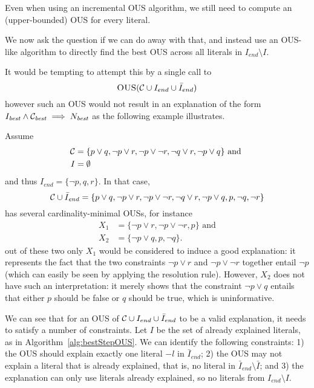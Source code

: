 Even when using an incremental OUS algorithm, we still need to compute an (upper-bounded) OUS for every literal.

We now ask the question if we can do away with that, and instead use an OUS-like algorithm to directly find the best OUS across all literals in $I_{end} \setminus I$.

It would be tempting to attempt this by a single call to 
\[\textsc{OUS}(\mathcal{C}  \cup I_{end} \cup \bar{I}_{end})\]
however such an OUS would not result in an explanation of the form $I_{\mathit{best}} \wedge \mathcal{C} _{\mathit{best}} \implies N_{\mathit{best}}$ as the following example illustrates. 
\begin{example}
Assume \begin{align*}
         \mathcal{C}  &= \{p\lor q, \lnot p \lor r, \lnot p \lor \lnot r, \lnot q\lor r, \lnot p \lor q \}\text{ and }\\
         I &= \emptyset
       \end{align*}
       and thus
$         I_{\mathit{end}} = \{ \lnot p, q, r\}.$
In that case, 
\[\mathcal{C} \cup \bar{I}_{\mathit{end}} = \{p\lor q, \lnot p \lor r, \lnot p \lor \lnot r, \lnot q\lor r, \lnot p \lor q , p,\lnot q,\lnot r \}\]
has several cardinality-minimal OUSs, for instance 
\begin{align*}
X_1 &=    \{\lnot p \lor r, \lnot p \lor \lnot r, p\}\text{ and}\\
X_2 &= \{\lnot p \lor q ,  p, \lnot q\}.
\end{align*}
out of these two only $X_1$ would be considered to induce a good explanation: it represents the fact that the two constraints $\lnot p \lor r$ and $ \lnot p \lor \lnot r$ together entail $\lnot p$ (which can easily be seen by applying the resolution rule). However, $X_2$ does not have such an interpretation: it merely shows that the constraint $\lnot p \lor q$ entails that either $p$ should be false or $q$ should be true, which is uninformative. 
\end{example}

We can see that for an OUS of $\mathcal{C}  \cup I_{end} \cup \bar{I}_{end}$ to be a valid explanation, it needs to satisfy a number of constraints. Let $I$ be the set of already explained literals, as in Algorithm~\ref{alg:bestStepOUS}. We can identify the following constraints: 1) the OUS should explain exactly one literal $-l$ in $\bar{I}_{end}$; 2) the OUS may not explain a literal that is already explained, that is, no literal in $\bar{I}_{end} \setminus \bar{I}$; and 3) the explanation can only use literals already explained, so no literals from $I_{end} \setminus I$.

